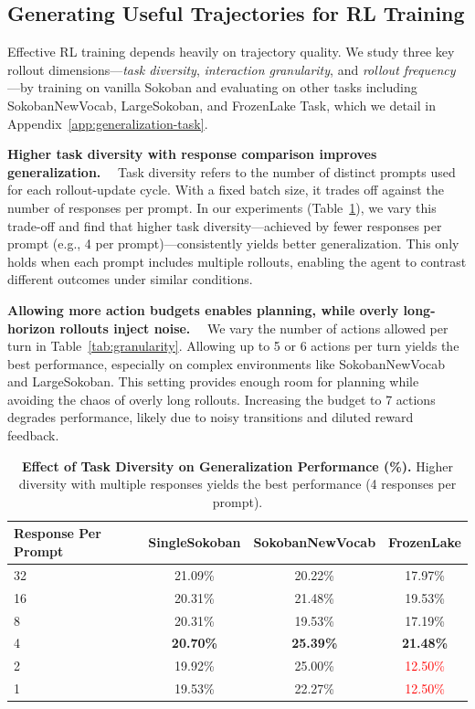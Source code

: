 \subsection{Generating Useful Trajectories for RL Training}
\label{sec:rollout}
Effective RL training depends heavily on trajectory quality. We study three key rollout dimensions—\textit{task diversity}, \textit{interaction granularity}, and \textit{rollout frequency}—by training on vanilla Sokoban and evaluating on other tasks including SokobanNewVocab, LargeSokoban, and FrozenLake Task, which we detail in Appendix~\ref{app:generalization-task}.

\noindent\textbf{Higher task diversity with response comparison improves generalization.}~~
Task diversity refers to the number of distinct prompts used for each rollout-update cycle. With a fixed batch size, it trades off against the number of responses per prompt. 
In our experiments (Table~\ref{tab:diversity}), we vary this trade-off and find that higher task diversity—achieved by fewer responses per prompt (e.g., 4 per prompt)—consistently yields better generalization. This only holds when each prompt includes multiple rollouts, enabling the agent to contrast different outcomes under similar conditions.

\noindent\textbf{Allowing more action budgets enables planning, while overly long-horizon rollouts inject noise.}~~
We vary the number of actions allowed per turn in Table~\ref{tab:granularity}. Allowing up to 5 or 6 actions per turn yields the best performance, especially on complex environments like SokobanNewVocab and LargeSokoban. This setting provides enough room for planning while avoiding the chaos of overly long rollouts. Increasing the budget to 7 actions degrades performance, likely due to noisy transitions and diluted reward feedback.

\begin{table}[t]
  \centering
  \small
    \caption{\textbf{Effect of Task Diversity on Generalization Performance (\%).} Higher diversity with multiple responses yields the best performance (4 responses per prompt).}
  \begin{tabular}{lccc}
    \toprule
    \textbf{Response Per Prompt} & \textbf{SingleSokoban} & \textbf{SokobanNewVocab} & \textbf{FrozenLake} \\
    \midrule
    32   & 21.09\% & 20.22\% & 17.97\% \\
    16   & 20.31\% & 21.48\% & 19.53\% \\
    8  & 20.31\% & 19.53\% & 17.19\% \\
    4  & \textbf{20.70\%} & \textbf{25.39\%} & \textbf{21.48\%} \\
    2  & 19.92\% & 25.00\% & \textcolor{red}{12.50\%} \\
    1 & 19.53\% & 22.27\% & \textcolor{red}{12.50\%} \\
    \bottomrule
  \end{tabular}
    \vspace{-8pt}
  \label{tab:diversity}
\end{table}



